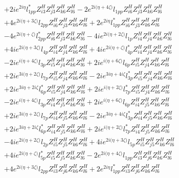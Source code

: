 \begin{align}
 &+2 i e^{2 i \eta } l_{1pp}^* Z_{{i 3}}^{H} Z_{{j 3}}^{H} Z_{{k 6}}^{H} Z_{{l 6}}^{H} -2 e^{2 i \Big(\eta +4 \zeta \Big)} l_{1pp} Z_{{i 6}}^{H} Z_{{j 3}}^{H} Z_{{k 6}}^{H} Z_{{l 6}}^{H} \nonumber \\ 
 &+4 e^{2 i \Big(\eta +3 \zeta \Big)} l_{2pp} Z_{{i 6}}^{H} Z_{{j 3}}^{H} Z_{{k 6}}^{H} Z_{{l 6}}^{H} +2 e^{2 i \eta } l_{1pp}^* Z_{{i 6}}^{H} Z_{{j 3}}^{H} Z_{{k 6}}^{H} Z_{{l 6}}^{H} \nonumber \\ 
 &-4 e^{2 i \Big(\eta +\zeta \Big)} l_{2pp}^* Z_{{i 6}}^{H} Z_{{j 3}}^{H} Z_{{k 6}}^{H} Z_{{l 6}}^{H} -4 i e^{2 i \Big(\eta +2 \zeta \Big)} l_{1p} Z_{{i 4}}^{H} Z_{{j 4}}^{H} Z_{{k 6}}^{H} Z_{{l 6}}^{H} \nonumber \\ 
 &+4 i e^{2 i \Big(\eta +3 \zeta \Big)} l_{4p} Z_{{i 4}}^{H} Z_{{j 4}}^{H} Z_{{k 6}}^{H} Z_{{l 6}}^{H} +4 i e^{2 i \Big(\eta +\zeta \Big)} l_{4p}^* Z_{{i 4}}^{H} Z_{{j 4}}^{H} Z_{{k 6}}^{H} Z_{{l 6}}^{H} \nonumber \\ 
 &-2 i e^{i \Big(\eta +4 \zeta \Big)} l_{3p} Z_{{i 5}}^{H} Z_{{j 4}}^{H} Z_{{k 6}}^{H} Z_{{l 6}}^{H} +2 i e^{i \Big(\eta +6 \zeta \Big)} l_{6p} Z_{{i 5}}^{H} Z_{{j 4}}^{H} Z_{{k 6}}^{H} Z_{{l 6}}^{H} \nonumber \\ 
 &+2 i e^{3 i \Big(\eta +2 \zeta \Big)} l_{7p} Z_{{i 5}}^{H} Z_{{j 4}}^{H} Z_{{k 6}}^{H} Z_{{l 6}}^{H} -2 i e^{3 i \eta +4 i \zeta } l_{3p}^* Z_{{i 5}}^{H} Z_{{j 4}}^{H} Z_{{k 6}}^{H} Z_{{l 6}}^{H} \nonumber \\ 
 &+2 i e^{3 i \eta +2 i \zeta } l_{6p}^* Z_{{i 5}}^{H} Z_{{j 4}}^{H} Z_{{k 6}}^{H} Z_{{l 6}}^{H} +2 i e^{i \Big(\eta +2 \zeta \Big)} l_{7p}^* Z_{{i 5}}^{H} Z_{{j 4}}^{H} Z_{{k 6}}^{H} Z_{{l 6}}^{H} \nonumber \\ 
 &-2 i e^{i \Big(\eta +4 \zeta \Big)} l_{3p} Z_{{i 4}}^{H} Z_{{j 5}}^{H} Z_{{k 6}}^{H} Z_{{l 6}}^{H} +2 i e^{i \Big(\eta +6 \zeta \Big)} l_{6p} Z_{{i 4}}^{H} Z_{{j 5}}^{H} Z_{{k 6}}^{H} Z_{{l 6}}^{H} \nonumber \\ 
 &+2 i e^{3 i \Big(\eta +2 \zeta \Big)} l_{7p} Z_{{i 4}}^{H} Z_{{j 5}}^{H} Z_{{k 6}}^{H} Z_{{l 6}}^{H} -2 i e^{3 i \eta +4 i \zeta } l_{3p}^* Z_{{i 4}}^{H} Z_{{j 5}}^{H} Z_{{k 6}}^{H} Z_{{l 6}}^{H} \nonumber \\ 
 &+2 i e^{3 i \eta +2 i \zeta } l_{6p}^* Z_{{i 4}}^{H} Z_{{j 5}}^{H} Z_{{k 6}}^{H} Z_{{l 6}}^{H} +2 i e^{i \Big(\eta +2 \zeta \Big)} l_{7p}^* Z_{{i 4}}^{H} Z_{{j 5}}^{H} Z_{{k 6}}^{H} Z_{{l 6}}^{H} \nonumber \\ 
 &-4 i e^{2 i \Big(\eta +2 \zeta \Big)} l_{2p} Z_{{i 5}}^{H} Z_{{j 5}}^{H} Z_{{k 6}}^{H} Z_{{l 6}}^{H} +4 i e^{2 i \Big(\eta +3 \zeta \Big)} l_{5p} Z_{{i 5}}^{H} Z_{{j 5}}^{H} Z_{{k 6}}^{H} Z_{{l 6}}^{H} \nonumber \\ 
 &+4 i e^{2 i \Big(\eta +\zeta \Big)} l_{5p}^* Z_{{i 5}}^{H} Z_{{j 5}}^{H} Z_{{k 6}}^{H} Z_{{l 6}}^{H} -2 e^{2 i \Big(\eta +4 \zeta \Big)} l_{1pp} Z_{{i 3}}^{H} Z_{{j 6}}^{H} Z_{{k 6}}^{H} Z_{{l 6}}^{H} \nonumber \\ 
 &+4 e^{2 i \Big(\eta +3 \zeta \Big)} l_{2pp} Z_{{i 3}}^{H} Z_{{j 6}}^{H} Z_{{k 6}}^{H} Z_{{l 6}}^{H} +2 e^{2 i \eta } l_{1pp}^* Z_{{i 3}}^{H} Z_{{j 6}}^{H} Z_{{k 6}}^{H} Z_{{l 6}}^{H} \nonumber 
\end{align} 
